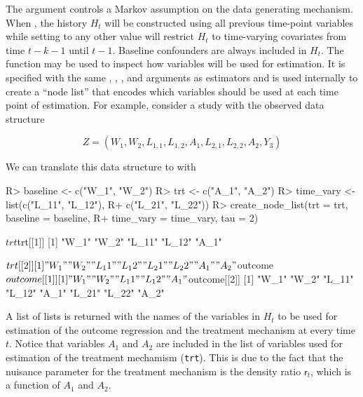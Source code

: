 \documentclass[]{jss}
\renewcommand{\r}{\mathsf{r}}
\begin{document}
The  argument controls a Markov assumption on the data
generating mechanism. When , the history \(H_t\) will be
constructed using all previous time-point variables while setting
 to any other value
will restrict \(H_t\) to time-varying covariates from time \(t - k -
1\) until $t-1$.
Baseline confounders are always included in \(H_t\). The
 function may be used to inspect how variables
will be used for estimation. It is specified with the same ,
, , and  arguments as
 estimators and is used internally to create a ``node list''
that encodes which variables should be used at each time point of
estimation. For example, consider a study with the observed data
structure

\begin{equation}
Z = (W_1, W_2, L_{1, 1}, L_{1, 2}, A_1, L_{2, 1}, L_{2, 2}, A_2, Y_3)
\end{equation}

We can translate this data structure to  with

\begin{CodeChunk}

\begin{CodeInput}
R> baseline <- c("W_1", "W_2")
R> trt <- c("A_1", "A_2")
R> time_vary <- list(c("L_11", "L_12"), 
R+                   c("L_21", "L_22"))
R> create_node_list(trt = trt, baseline = baseline, 
R+                  time_vary = time_vary, tau = 2)
\end{CodeInput}

\begin{CodeOutput}
$trt
$trt[[1]]
[1] "W_1"  "W_2"  "L_11" "L_12" "A_1" 

$trt[[2]]
[1] "W_1"  "W_2"  "L_11" "L_12" "L_21" "L_22" "A_1"  "A_2" 


$outcome
$outcome[[1]]
[1] "W_1"  "W_2"  "L_11" "L_12" "A_1" 

$outcome[[2]]
[1] "W_1"  "W_2"  "L_11" "L_12" "A_1"  "L_21" "L_22" "A_2" 
\end{CodeOutput}
\end{CodeChunk}

A list of lists is returned with the names of the variables in \(H_t\)
to be used for estimation of the outcome regression and the treatment
mechanism at every time \(t\).  Notice that variables \(A_1\) and
\(A_2\) are included in the list of variables used for estimation of
the treatment mechamism (\texttt{trt}). This is due to the fact that
the nuisance parameter for the treatment mechanism is the density
ratio $\r_t$, which is a function of \(A_1\) and \(A_2\).
\end{document}
